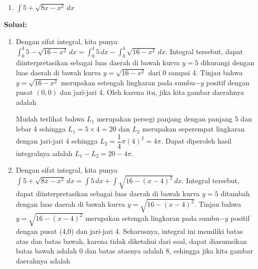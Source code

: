 \documentclass{article}
\begin{document}
\begin{enumerate}
\begin{enumerate}
	 		\item $\displaystyle \int 5+\sqrt{8x-x^2} \, dx$
	 	\end{enumerate}
	 	\textbf{Solusi:}
	 	\begin{enumerate}
	 		\item Dengan sifat integral, kita punya $\displaystyle \int_0^4 5-\sqrt{16-x^2} \, dx = \int_0^4 5 \, dx- \int_0^4 \sqrt{16-x^2} \, dx$. Integral tersebut, dapat diinterpretasikan sebagai luas daerah di bawah kurva $y=5$ dikurangi dengan luas daerah di bawah kurva $y=\sqrt{16-x^2}$ dari 0 sampai 4. Tinjau bahwa $y=\sqrt{16-x^2}$ merupakan setengah lingkaran pada sumbu$-y$ positif dengan pusat $(0,0)$ dan jari-jari 4. Oleh karena itu, jika kita gambar daerahnya adalah 
	 		\begin{center}
	 		 \qquad
{}
	 		\end{center}
	 		Mudah terlihat bahwa $L_1$ merupakan persegi panjang dengan panjang 5 dan lebar 4 sehingga $L_1=5\times 4=20$ dan $L_2$ merupakan seperempat lingkaran dengan jari-jari $4$ sehingga $L_2=\dfrac{1}{4}\pi(4)^2=4\pi$. Dapat diperoleh hasil integralnya adalah $L_1-L_2=20-4\pi$.  
	 		\item Dengan sifat integral, kita punya $\displaystyle \int 5+\sqrt{8x-x^2} \, dx = \int 5 \, dx+ \int \sqrt{16-(x-4)^2} \, dx$. Integral tersebut, dapat diinterpretasikan sebagai luas daerah di bawah kurva $y=5$ ditambah dengan luas daerah di bawah kurva $y=\sqrt{16-(x-4)^2}$. Tinjau bahwa $y=\sqrt{16-(x-4)^2}$ merupakan setengah lingkaran pada sumbu$-y$ positif dengan pusat (4,0) dan jari-jari 4. Seharusnya, integral ini memiliki batas atas dan batas bawah, karena tidak diketahui dari soal, dapat diasumsikan batas bawah adalah 0 dan batas atasnya adalah 8, sehingga jika kita gambar daerahnya adalah 

\end{enumerate}
\end{enumerate}
\end{document}
